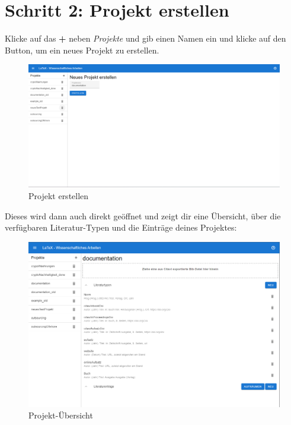 \documentclass[12pt]{article}
\begin{document}
\section{Schritt 2: Projekt erstellen}
Klicke auf das \textbf{+} neben \textit{Projekte} und gib einen Namen ein und klicke auf den Button, um ein neues Projekt zu erstellen.
\FloatBarrier
\begin{figure}[!ht]
\includegraphics[width=.9\textwidth]{images/screenshot_2.png}
\caption{Projekt erstellen}
\end{figure}
\FloatBarrier
\noindent Dieses wird dann auch direkt geöffnet und zeigt dir eine Übersicht, über die verfügbaren Literatur-Typen und die Einträge deines Projektes:
\FloatBarrier
\begin{figure}[!ht]
\includegraphics[width=.9\textwidth]{images/screenshot_3.png}
\caption{Projekt-Übersicht}
\end{figure}
\FloatBarrier
\end{document}
